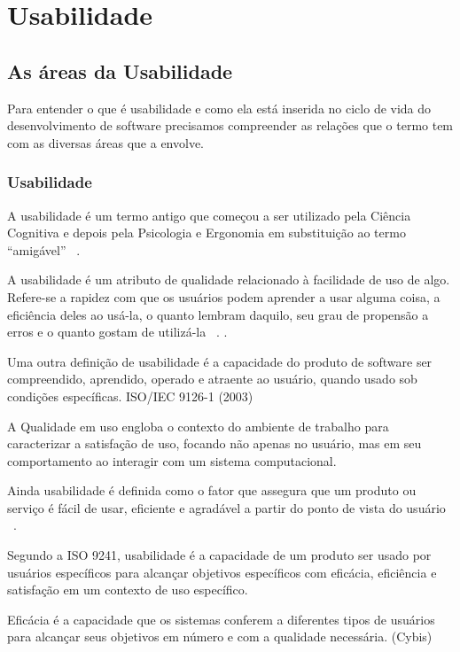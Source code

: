 \chapter{Usabilidade}

\section{As áreas da Usabilidade}

	Para entender o que é usabilidade e como ela está inserida no ciclo de vida do desenvolvimento de software precisamos compreender as relações que o termo tem com as diversas áreas que a envolve. 

\subsection{Usabilidade}

	A usabilidade é um termo antigo que começou a ser utilizado pela Ciência Cognitiva e depois pela Psicologia e Ergonomia em substituição ao termo “amigável” ~\cite{dias2006}.

	A usabilidade é um atributo de qualidade relacionado à facilidade de uso de algo. Refere-se a rapidez com que os usuários podem aprender a usar alguma coisa, a eficiência deles ao usá-la, o quanto lembram daquilo, seu grau de propensão a erros e o quanto gostam de utilizá-la ~\cite{nielsen2007}. .

	Uma outra definição de usabilidade é a capacidade do produto de software ser compreendido, aprendido, operado e atraente ao usuário, quando usado sob condições específicas. ISO/IEC 9126-1 (2003)

	A Qualidade em uso engloba o contexto do ambiente de trabalho para caracterizar a satisfação de uso, focando não apenas no usuário, mas em seu comportamento ao interagir com um sistema computacional.


	Ainda usabilidade é definida como o fator que assegura que um produto ou serviço é fácil de usar, eficiente e agradável a partir do ponto de vista do usuário ~\cite{preece2007}.

	Segundo a ISO 9241, usabilidade é a capacidade de um produto ser usado por usuários específicos para alcançar objetivos específicos com eficácia, eficiência e satisfação em um contexto de uso específico.

	Eficácia é a capacidade que os sistemas conferem a diferentes tipos de usuários para alcançar seus objetivos em número e com a qualidade necessária. (Cybis)

